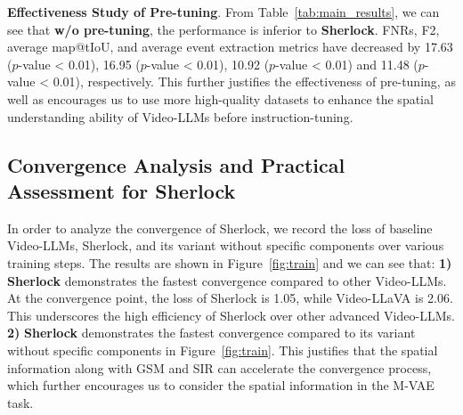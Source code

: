


\textbf{Effectiveness Study of Pre-tuning}. From Table~\ref{tab:main_results}, we can see that \textbf{w/o pre-tuning}, the performance is inferior to \textbf{Sherlock}. FNRs, F2, average map@tIoU, and average event extraction metrics have decreased by 17.63 ($p$-value < 0.01), 16.95 ($p$-value < 0.01), 10.92 ($p$-value < 0.01) and 11.48 ($p$-value < 0.01), respectively. This further justifies the effectiveness of pre-tuning, as well as encourages us to use more high-quality datasets to enhance the spatial understanding ability of Video-LLMs before instruction-tuning. 





\subsection{Convergence Analysis and Practical Assessment for Sherlock}
In order to analyze the convergence of Sherlock, we record the loss of baseline Video-LLMs, Sherlock, and its variant without specific components over various training steps. The results are shown in Figure~\ref{fig:train} and we can see that: \textbf{1)} \textbf{Sherlock} demonstrates the fastest convergence compared to other Video-LLMs. At the convergence point, the loss of Sherlock is 1.05, while Video-LLaVA is 2.06. This underscores the high efficiency of Sherlock over other advanced Video-LLMs. \textbf{2)} \textbf{Sherlock} demonstrates the fastest convergence compared to its variant without specific components in Figure~\ref{fig:train}. This justifies that the spatial information along with GSM and SIR can accelerate the convergence process, which further encourages us to consider the spatial information in the M-VAE task. 

